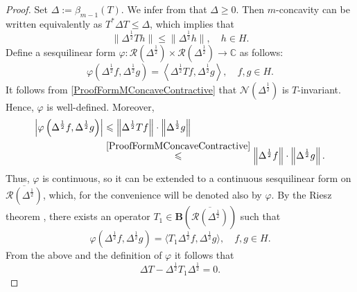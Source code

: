 \documentclass{amsart}
\renewcommand{\le}{\leqslant}
\renewcommand{\ge}{\geqslant}
\theoremstyle{definition}
\numberwithin{equation}{section}
\begin{document}
\begin{proof}
    Set $ \Delta := \beta_{m-1}(T) $. We infer from \cite[Theorem 2.5]{guOnMExpansiveMContractiveOperators} that $ \Delta \ge 0 $. Then $ m $-concavity can be written equivalently as $ T^{\ast}\Delta T \le \Delta $, which implies that
    \begin{equation}
        \label{ProofFormMConcaveContractive}
        \lVert \Delta^{\frac{1}{2}}Th\rVert \le \lVert \Delta^{\frac{1}{2}}h\rVert, \quad h\in H. 
    \end{equation}
    Define a sesquilinear form $ \varphi\colon \mathcal{R}(\Delta^{\frac{1}{2}})\times \mathcal{R}(\Delta^{\frac{1}{2}}) \to \mathbb{C} $ as follows:
    \begin{equation*}
        \varphi\left(\Delta^{\frac{1}{2}}f,\Delta^{\frac{1}{2}}g\right) = \left\langle \Delta^{\frac{1}{2}}Tf, \Delta^{\frac{1}{2}}g\right\rangle, \quad f,g\in H.
    \end{equation*}
    It follows from \eqref{ProofFormMConcaveContractive} that $ \mathcal{N}(\Delta^{\frac{1}{2}}) $ is $ T $-invariant. Hence, $ \varphi $ is well-defined. Moreover,
    \begin{align*}
        \left\lvert \varphi\left( \Delta^{\frac{1}{2}}f,\Delta^{\frac{1}{2}}g \right)\right\rvert &\le \left \lVert \Delta^{\frac{1}{2}}Tf\right \rVert \cdot \left \lVert \Delta^{\frac{1}{2}} g\right \rVert \\
        &\stackrel{\eqref{ProofFormMConcaveContractive}}{\le} \left \lVert \Delta^{\frac{1}{2}}f\right \rVert \cdot \left \lVert \Delta^{\frac{1}{2}} g\right \rVert.
    \end{align*}
    Thus, $ \varphi $ is continuous, so it can be extended to a continuous sesquilinear form on $ \overline{\mathcal{R}(\Delta^{\frac{1}{2}})} $, which, for the convenience will be denoted also by $ \varphi $. By the Riesz theorem \cite[Theorem 12.8]{rudinFunctionalAnalysis}, there exists an operator $ T_{1}\in \mathbf{B}(\overline{\mathcal{R}(\Delta^{\frac{1}{2}})}) $ such that
    \begin{equation*}
        \varphi\left( \Delta^{\frac{1}{2}}f,\Delta^{\frac{1}{2}}g \right) = \langle T_{1}\Delta^{\frac{1}{2}}f,\Delta^{\frac{1}{2}}g\rangle, \quad f,g\in H.
    \end{equation*}
    From the above and the definition of $ \varphi $ it follows that
    \begin{equation}
        \label{ProofFormCommutation}
        \Delta T - \Delta^{\frac{1}{2}}T_{1}\Delta^{\frac{1}{2}} = 0.
    \end{equation}

\end{proof}
\end{document}
